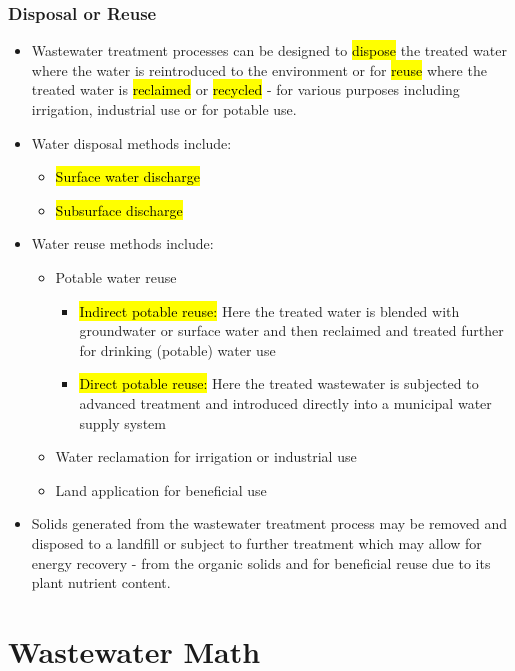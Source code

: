 \subsection{Disposal or Reuse}

\begin{itemize}
\item Wastewater treatment processes can be designed to \hl{dispose} the treated water where the water is reintroduced to the environment or for \hl{reuse} where the treated water is \hl{reclaimed} or \hl{recycled} - for various purposes including irrigation, industrial use or for potable use.
\item Water disposal methods include:\\
\begin{itemize}
\item \hl{Surface water discharge}
\item \hl{Subsurface discharge}
\end{itemize}
\item Water reuse methods include:\\
\begin{itemize}
\item Potable water reuse
\begin{itemize}
\item \hl{Indirect potable reuse:}  Here the treated water is blended with groundwater or surface water and then reclaimed and treated further 
for drinking (potable) water use
\item \hl{Direct potable reuse:}  Here the treated wastewater is subjected to advanced treatment and introduced directly into a municipal water supply system
\end{itemize}
\item Water reclamation for irrigation or industrial use\\
\item Land application for beneficial use\\
\end{itemize}
\item Solids generated from the wastewater treatment process may be removed and disposed to a landfill or subject to further treatment which may allow for energy recovery - from the organic solids and for beneficial reuse due to its plant nutrient content.\\
\end{itemize}


\chapter{Wastewater Math}


